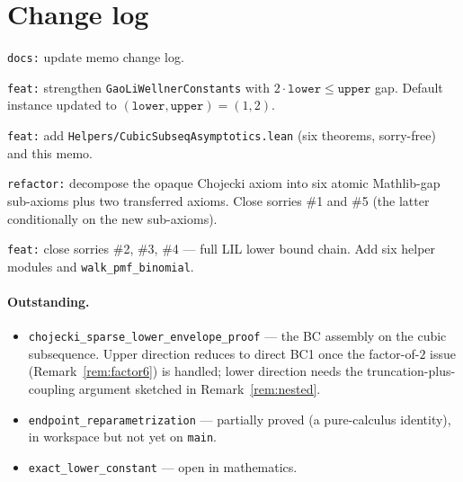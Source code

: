 \documentclass[11pt]{article}
\theoremstyle{plain}
\theoremstyle{definition}
\theoremstyle{remark}
\begin{document}
\section{Change log}

\begin{description}[leftmargin=2.1cm,style=nextline]
  \item[\texttt{efe0af2}] \texttt{docs:} update memo change log.
  \item[\texttt{c6e3cba}] \texttt{feat:} strengthen
    \texttt{GaoLiWellnerConstants} with $2\cdot\texttt{lower} \le
    \texttt{upper}$ gap. Default instance updated to
    $(\texttt{lower},\texttt{upper}) = (1,2)$.
  \item[\texttt{68d7240}] \texttt{feat:} add
    \texttt{Helpers/CubicSubseqAsymptotics.lean} (six theorems,
    sorry-free) and this memo.
  \item[\texttt{6e7bc7e}] \texttt{refactor:} decompose the opaque
    Chojecki axiom into six atomic Mathlib-gap sub-axioms plus two
    transferred axioms. Close sorries \#1 and \#5 (the latter
    conditionally on the new sub-axioms).
  \item[\texttt{315e8e1}] \texttt{feat:} close sorries \#2, \#3, \#4 —
    full LIL lower bound chain. Add six helper modules and
    \texttt{walk\_pmf\_binomial}.
\end{description}

\paragraph{Outstanding.}
\begin{itemize}
  \item \texttt{chojecki\_sparse\_lower\_envelope\_proof} — the BC
    assembly on the cubic subsequence. Upper direction reduces to
    direct BC1 once the factor-of-$2$ issue (Remark~\ref{rem:factor6})
    is handled; lower direction needs the truncation-plus-coupling
    argument sketched in Remark~\ref{rem:nested}.
  \item \texttt{endpoint\_reparametrization} — partially proved (a
    pure-calculus identity), in workspace but not yet on \texttt{main}.
  \item \texttt{exact\_lower\_constant} — open in mathematics.
\end{itemize}
\end{document}
